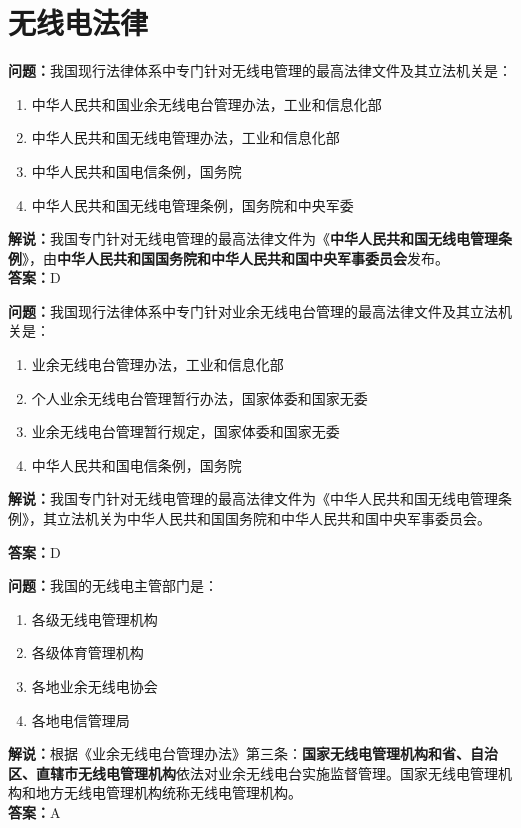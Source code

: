\chapter{无线电法律}

\textbf{问题：}我国现行法律体系中专门针对无线电管理的最高法律文件及其立法机关是：

\begin{enumerate}[label=\Alph*), leftmargin=1cm]
	\item 中华人民共和国业余无线电台管理办法，工业和信息化部
	\item 中华人民共和国无线电管理办法，工业和信息化部
	\item 中华人民共和国电信条例，国务院
	\item 中华人民共和国无线电管理条例，国务院和中央军委
\end{enumerate}

\textbf{解说：}我国专门针对无线电管理的最高法律文件为《\textbf{中华人民共和国无线电管理条例}》，由\textbf{中华人民共和国国务院和中华人民共和国中央军事委员会}发布。\\\textbf{答案：}D

\textbf{问题：}我国现行法律体系中专门针对业余无线电台管理的最高法律文件及其立法机关是：

\begin{enumerate}[label=\Alph*), leftmargin=1cm]
	\item 业余无线电台管理办法，工业和信息化部
	\item 个人业余无线电台管理暂行办法，国家体委和国家无委
	\item 业余无线电台管理暂行规定，国家体委和国家无委
	\item 中华人民共和国电信条例，国务院
\end{enumerate}

\textbf{解说：}我国专门针对无线电管理的最高法律文件为《中华人民共和国无线电管理条例》，其立法机关为中华人民共和国国务院和中华人民共和国中央军事委员会。

\textbf{答案：}D

\textbf{问题：}我国的无线电主管部门是：

\begin{enumerate}[label=\Alph*), leftmargin=1cm]
	\item 各级无线电管理机构
	\item 各级体育管理机构
	\item 各地业余无线电协会
	\item 各地电信管理局
\end{enumerate}

\textbf{解说：}根据《业余无线电台管理办法》第三条：\textbf{国家无线电管理机构和省、自治区、直辖市无线电管理机构}依法对业余无线电台实施监督管理。国家无线电管理机构和地方无线电管理机构统称无线电管理机构。\\\textbf{答案：}A

